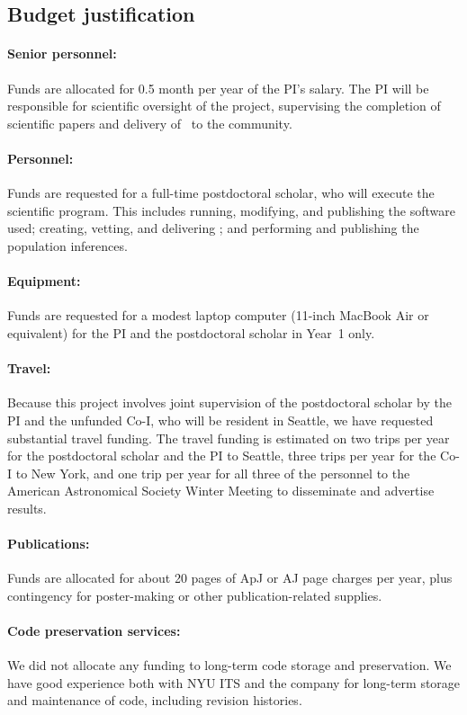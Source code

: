 \documentclass[12pt]{article}
\begin{document}
\subsection*{Budget justification}

\paragraph{Senior personnel:}
Funds are allocated for 0.5 month per year of the PI's salary.
The PI will be responsible for scientific oversight of the project,
supervising the completion of scientific papers and delivery of
\catalogname\ to the community.

\paragraph{Personnel:}
Funds are requested for a full-time postdoctoral scholar, who will
execute the scientific program.
This includes running, modifying, and publishing the software used;
creating, vetting, and delivering \catalogname;
and performing and publishing the population inferences.

\paragraph{Equipment:}
Funds are requested for a modest laptop computer (11-inch MacBook Air
or equivalent) for the PI and the postdoctoral scholar in Year~1 only.

\paragraph{Travel:}
Because this project involves joint supervision of the postdoctoral
scholar by the PI and the unfunded Co-I, who will be resident in
Seattle, we have requested substantial travel funding.
The travel funding is estimated on two trips per year for the
postdoctoral scholar and the PI to Seattle, three trips per year
for the Co-I to New York, and one trip per year for all three of
the personnel to the American Astronomical
Society Winter Meeting to disseminate and advertise results.

\paragraph{Publications:}
Funds are allocated for about 20 pages of ApJ or AJ page charges per
year, plus contingency for poster-making or other publication-related
supplies.

\paragraph{Code preservation services:}
We did not allocate any funding to long-term code storage and
preservation.
We have good experience both with NYU ITS and the company
 for long-term storage and maintenance of code,
including revision histories.
\end{document}
